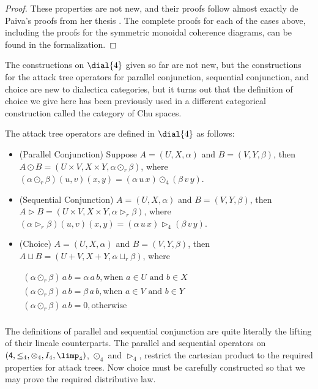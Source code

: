 \begin{proof}
  These properties are not new, and their proofs follow almost exactly
  de Paiva's proofs from her thesis \cite{dePaiva:1987}.  The complete
  proofs for each of the cases above, including the proofs for the
  symmetric monoidal coherence diagrams, can be found in the
  formalization.
\end{proof}

The constructions on $\dial{4}$ given so far are not new, but the
constructions for the attack tree operators for parallel conjunction,
sequential conjunction, and choice are new to dialectica categories,
but it turns out that the definition of choice we give here has been
previously used in a different categorical construction called the
category of Chu spaces.
\begin{definition}
  \label{def:attack-tree-ops-dialectica}
  The attack tree operators are defined in $\dial{4}$ as follows:
  \begin{itemize}
  \item[] (Parallel Conjunction) Suppose $A = (U , X , \alpha)$ and $B = (V , Y , \beta)$, then
    $A \odot B = (U \times V, X \times Y, \alpha \odot_r \beta)$, where
    $(\alpha \odot_r \beta)(u , v)(x , y) = (\alpha\,u\,x) \odot_4 (\beta\,v\,y)$.\\[-5px]

  \item[] (Sequential Conjunction) $A = (U , X , \alpha)$ and $B = (V , Y , \beta)$, then
    $A \rhd B = (U \times V, X \times Y, \alpha \rhd_r \beta)$, where
    $(\alpha \rhd_r \beta)(u , v)(x , y) = (\alpha\,u\,x) \rhd_4 (\beta\,v\,y)$.\\[-5px]
    
  \item[] (Choice) $A = (U , X , \alpha)$ and $B = (V , Y , \beta)$, then
    $A \sqcup B = (U + V, X + Y, \alpha \sqcup_r \beta)$, where
    \begin{center}
      \begin{math}
        \begin{array}{lll}
          (\alpha \odot_r \beta)\,a\,b = \alpha\,a\,b, \text{when $a \in U$ and $b \in X$}\\
          (\alpha \odot_r \beta)\,a\,b = \beta\,a\,b, \text{when $a \in V$ and $b \in Y$}\\
          (\alpha \odot_r \beta)\,a\,b = 0, \text{otherwise}\\
        \end{array}
      \end{math}
    \end{center}
  \end{itemize}
\end{definition}
The definitions of parallel and sequential conjunction are quite
literally the lifting of their lineale counterparts.  The parallel and
sequential operators on $(\mathsf{4}, \leq_4,\otimes_4,I_4,\limp_4)$,
$\odot_4$ and $\rhd_4$, restrict the cartesian product to the required
properties for attack trees.  Now choice must be carefully constructed
so that we may prove the required distributive law.

